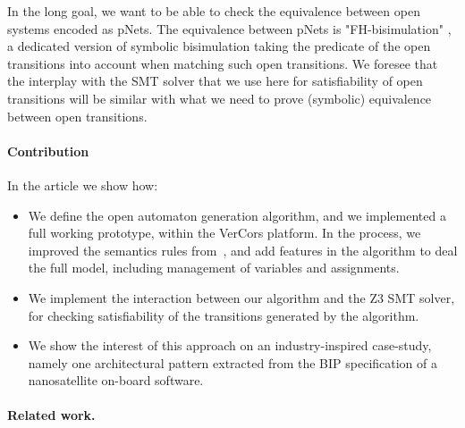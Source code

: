 \documentclass{lncs/llncs}
\newcommand{\TODO}[1]{\textcolor{red}{\textbf{[TODO:#1]}}}
\begin{document}
In the long goal, we want to be able to check the equivalence between
open systems encoded as pNets. The equivalence between pNets is
"FH-bisimulation" \cite{henrio:Forte2016}, a dedicated version of
symbolic bisimulation taking the  
predicate of the open transitions into account when matching such
open transitions. We foresee that the interplay with the SMT solver
that we use here for satisfiability of open transitions will be
similar with what we need to prove (symbolic) equivalence between open
transitions. 

\paragraph{Contribution}
In the article we show how:
\begin{itemize}
\item We define the open automaton generation algorithm, and we
  implemented a full working prototype, within the 
  VerCors platform. In the process, we improved the
  semantics rules from~\cite{henrio:Forte2016}, and add features in
  the algorithm to deal the full 
  model, including management of variables and assignments.
\item We implement the interaction between our algorithm and the Z3
    SMT solver, for checking satisfiability of the transitions
    generated by the algorithm.
\item We show the interest of this approach on an
    industry-inspired case-study, namely one architectural pattern
    extracted from the BIP specification of a nanosatellite on-board
    software.
\end{itemize}





\paragraph{Related work.}


\end{document}
